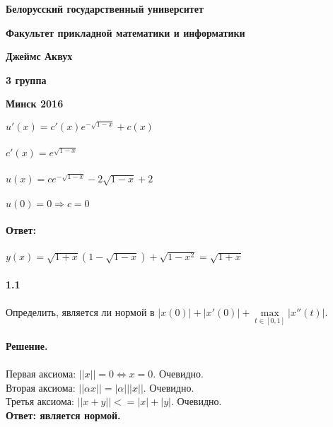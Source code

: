 \documentclass[10pt,a4paper]{article}
\begin{document}
	\begin{titlepage}
		
		\centerline{\large \bf Белорусский государственный университет}
		\centerline{\large \bf Факультет прикладной математики и информатики}
		\vfill
		\vfill
		\vfill
		\vfill
		\vfill
		\vfill
		\centerline{\Large \bf Джеймс Аквух}
		\centerline{\Large \bf 3 группа}
		\bigskip
		\vfill
		\bigskip
		\vfill
		\vfill
		\vfill
		\hfill
		\vfill
		\vfill
		\centerline{\Large \bf Минск 2016}
	\end{titlepage}
	\noindent
	$u'(x)=c'(x)e^{-\sqrt{1-x}}+c(x)$\\ \\
	$c'(x)=e^{\sqrt{1-x}}$\\ \\
	$u(x)=ce^{-\sqrt{1-x}}-2\sqrt{1-x}+2$\\ \\
	$u(0)=0 \Rightarrow c=0$\\ \\
	\textbf{Ответ:} \\ \\
	$y(x)=\sqrt{1+x}(1-\sqrt{1-x})+\sqrt{1-x^2}=\sqrt{1+x}$\\ \\
	
	\noindent\textbf{1.1} \\  \\
	Определить, является ли нормой в $|x(0)|+|x'(0)|+\max\limits_{t\in {[0,1]}} |x''(t)|$. \\ \\
	\textbf{Решение.} \\ \\
	Первая аксиома:
	$ ||x|| = 0 \Leftrightarrow x = 0$. Очевидно. \\
	Вторая аксиома:
	$ ||\alpha x|| = |\alpha|||x||$. Очевидно.\\
	Третья аксиома:
	$||x+y||<=|x|+|y|$. Очевидно.\\
	\textbf{Ответ: является нормой.} \\ \\
	
\end{document}
